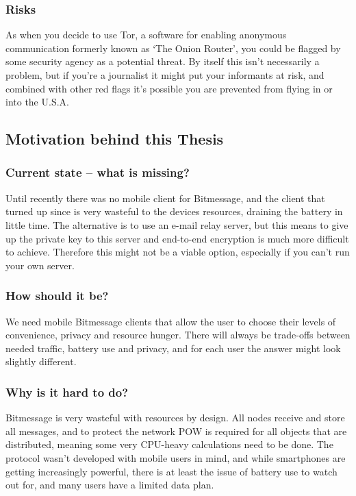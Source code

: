 \documentclass{bfh}
\begin{document}
  \subsubsection{Risks}
  As when you decide to use Tor, a software for enabling anonymous communication formerly known as `The Onion Router', you could be flagged by some security agency as a potential threat.\cite{wired:tor} By itself this isn't necessarily a problem, but if you're a journalist it might put your informants at risk, and combined with other red flags it's possible you are prevented from flying in or into the U.S.A.


  \subsection{Motivation behind this Thesis}
  \subsubsection{Current state -- what is missing?}
  Until recently there was no mobile client for Bitmessage, and the client that turned up since is very wasteful to the devices resources, draining the battery in little time. The alternative is to use an e-mail relay server, but this means to give up the private key to this server and end-to-end encryption is much more difficult to achieve. Therefore this might not be a viable option, especially if you can't run your own server.

  \subsubsection{How should it be?}
  We need mobile Bitmessage clients that allow the user to choose their levels of convenience, privacy and resource hunger. There will always be trade-offs between needed traffic, battery use and privacy, and for each user the answer might look slightly different.

  \subsubsection{Why is it hard to do?}
  Bitmessage is very wasteful with resources by design. All nodes receive and store all messages, and to protect the network \ac{POW} is required for all objects that are distributed, meaning some very \acs{CPU}-heavy calculations need to be done. The protocol wasn't developed with mobile users in mind, and while smartphones are getting increasingly powerful, there is at least the issue of battery use to watch out for, and many users have a limited data plan.
\end{document}
